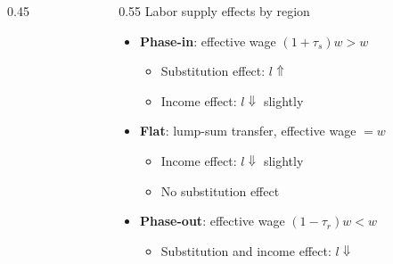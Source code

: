 \documentclass[aspectratio=169]{beamer}
\begin{document}
\begin{frame}
\begin{columns}
\begin{column}{0.45\textwidth}
\begin{tikzpicture}[scale=0.85]


\end{tikzpicture}
\end{column}
\begin{column}{0.55\textwidth}
Labor supply effects by region
\begin{itemize}\setlength\itemsep{3pt}
    \item \textbf{Phase-in}: effective wage
    $(1+\tau_s)w > w$
    \begin{itemize}
      \item Substitution effect: $l\Uparrow$
      \item Income effect: $l\Downarrow$ slightly
    \end{itemize}
    
    \item \textbf{Flat}: lump-sum transfer,
    effective wage $= w$
    \begin{itemize}
      \item  Income effect: $l\Downarrow$ slightly
      \item No substitution effect
    \end{itemize}
     
    \item \textbf{Phase-out}: effective wage
    $(1-\tau_r)w < w$
    \begin{itemize}
    \item Substitution and income effect: $l\Downarrow$
    \end{itemize}
    
\end{itemize}

\end{column}
\end{columns}
\end{frame}
\end{document}
